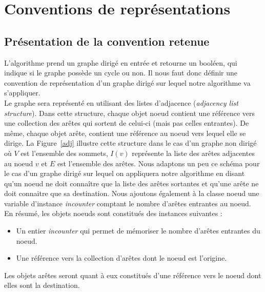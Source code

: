 \section{Conventions de représentations}

\subsection{Présentation de la convention retenue}
L'algorithme prend un graphe dirigé en entrée et retourne un booléen, qui indique si le graphe possède un cycle ou non. Il nous faut donc définir une convention de représentation d'un graphe dirigé sur lequel notre algorithme va s'appliquer. \\

Le graphe sera représenté en utilisant des listes d'adjacence (\textit{adjacency list structure}). Dans cette structure, chaque objet noeud contient une référence vers une collection des arêtes qui sortent de celui-ci (mais pas celles entrantes). De même, chaque objet arête, contient une référence au noeud vers lequel elle se dirige. 
La Figure~\ref{adj} illustre cette structure dans le cas d'un graphe non dirigé où $V$ est l'ensemble des sommets, $I(v)$ représente la liste des arêtes adjacentes au noeud $v$ et $E$ est l'ensemble des arêtes. Nous adaptons un peu ce schéma pour le cas d'un graphe dirigé sur lequel on appliquera notre algorithme en disant qu'un noeud ne doit connaître que la liste des arêtes sortantes et qu'une arête ne doit connaitre que sa destination. Nous ajoutons également à la classe noeud une variable d'instance \textit{incounter} comptant le nombre d'arêtes entrantes au noeud. 
\\%

En résumé, les objets noeuds sont constitués des instances suivantes : 
\begin{itemize}
\item Un entier \textit{incounter} qui permet de mémoriser le nombre d'arêtes entrantes du noeud.
\item Une référence vers la collection d'arêtes dont le noeud est l'origine.\\
\end{itemize}

Les objets arêtes seront quant à eux constitués d'une référence vers le noeud dont elles sont la destination.\\

